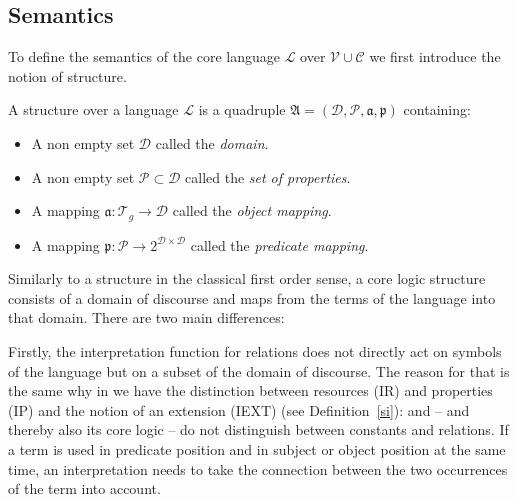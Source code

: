 \subsection{Semantics}
To define the semantics of the core language $\mathcal{L}$ over $\mathcal{V}\cup\mathcal{C}$ we first introduce the notion of structure. 

\begin{definition}[Structure]
A structure over a language $\mathcal{L}$ 
is a quadruple $\mathfrak{A}=(\mathcal{D},\mathcal{P}, \mathfrak{a}, \mathfrak{p})$ containing:
\begin{itemize}
 \item A non empty set $\mathcal{D}$  
 called the \emph{domain}.
 \item A non empty set $\mathcal{P}\subset\mathcal{D}$ called the \emph{set of properties}.
 \item A mapping $\mathfrak{a}: \mathcal{T}_g\rightarrow \mathcal{D}$ 
 called the \emph{object mapping}.
\item A mapping $\mathfrak{p}: \mathcal{P}\rightarrow 2^{\mathcal{D}\times\mathcal{D}}$ called the \emph{predicate mapping}.  
\end{itemize}
\end{definition}
Similarly to a structure in the classical first order sense, a core logic structure 
consists of a domain of discourse and maps from the terms of the language into that domain. There are two main differences:


Firstly, the interpretation function for relations does not directly act on symbols of the language but on a subset of the domain of discourse.
The reason for that is the same why in \rdf we have the distinction between resources (IR) and properties (IP) and the notion of an extension (IEXT) (see Definition~\ref{si}):
\rdf and \nthree{} -- and thereby also its core logic -- do not distinguish between constants and relations.  If a term is used in predicate position and in subject or object position 
at the same time, an interpretation needs to take the connection between the two occurrences of the term into account. 

